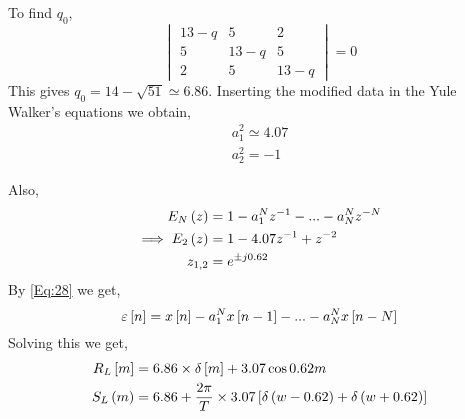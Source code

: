 \documentclass{beamer}
\begin{document}
\begin{frame}{}
    To find $q_0$,
\begin{equation}
    \begin{vmatrix}
   13-q & 5 & 2 \\
   5 & 13-q & 5 \\
   2 & 5 & 13-q
\end{vmatrix} 
= 0
\end{equation}
This gives $q_0 = 14 - \sqrt{51} \simeq 6.86$.  
Inserting the modified data in the Yule Walker's equations we obtain,
\begin{align}
    a_1^2 \simeq 4.07 \\
    a_2^2 = -1
\end{align}
\end{frame}

\begin{frame}{}
    Also,
\begin{align}
    E_N\left(z\right) &= 1 - a_1^Nz^{-1} - ... - a_N^Nz^{-N} \\ \label{Eq:28}
    \implies E_2\left(z\right) &= 1 - 4.07z^{-1} + z^{-2} \\
     z_{1,2} &= e^{\pm j0.62}
\end{align}
By \eqref{Eq:28} we get,
\begin{equation}
    \varepsilon{}\left[n\right] = x{}\left[n\right] - a_1^Nx{}\left[n-1\right] - ... - a_N^Nx{}\left[n-N\right]
\end{equation}
Solving this we get,
\begin{align}
    R_L{}\left[m\right] &= 6.86 \times \delta{}\left[m\right] + 3.07 \cos{0.62m} \\
    S_L \left(m\right) &= 6.86 + \frac{2\pi}{T}\times 3.07{}\left[\delta\left(w-0.62\right) + \delta\left(w + 0.62\right)\right]
\end{align}
\end{frame}
\end{document}

